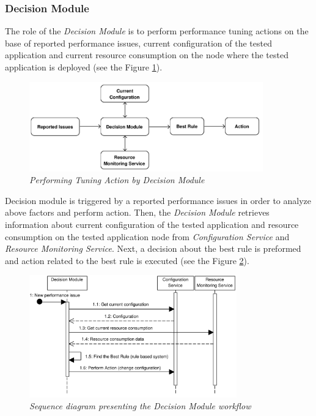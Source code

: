 \documentclass[12pt,a4paper]{article}
\begin{document}
\subsubsection{Decision Module} \label{dm}

The role of the \textit{Decision Module} is to perform performance tuning actions on the base of reported performance issues, current configuration of the tested application and current resource consumption on the node where the tested application is deployed (see the Figure \ref{decisionmodule}). 

\begin{figure}[!htb]
\centering
\includegraphics[width=0.9\textwidth]{DecisionModuleDiagram}
\caption{\textit{Performing Tuning Action by Decision Module}} \label{decisionmodule}
\end{figure}

Decision module is triggered by a reported performance issues in order to analyze above factors and perform action. Then, the \textit{Decision Module} retrieves information about current configuration of the tested application and resource consumption on the tested application node from \textit{Configuration Service} and \textit{Resource Monitoring Service}. Next, a decision about the best rule is preformed and action related to the best rule is executed (see the Figure \ref{dmsequence}). 

\begin{figure}[!htb]
\centering
\includegraphics[width=0.8\textwidth]{DecisionModuleSequenceDiagram}
\caption{\textit{Sequence diagram presenting the Decision Module workflow}} \label{dmsequence}
\end{figure}
\end{document}
